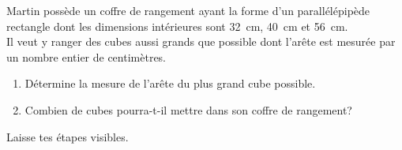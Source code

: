 %
%
    Martin possède un coffre de rangement ayant la forme d’un parallélépipède rectangle dont les dimensions intérieures sont \SI{32}{cm}, \SI{40}{cm} et \SI{56}{cm}. \\
Il veut y ranger des cubes aussi grands que possible dont l’arête est mesurée par un nombre entier de centimètres.
\begin{enumerate}
    \item Détermine la mesure de l'arête du plus grand cube possible.
    \item Combien de cubes pourra-t-il mettre dans son coffre de rangement?
\end{enumerate}
Laisse tes étapes visibles.
